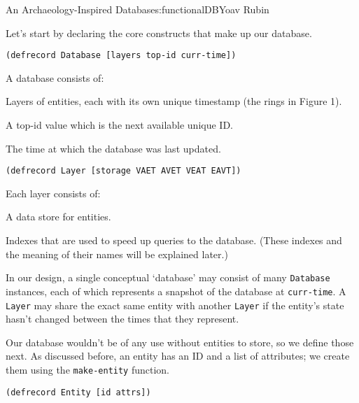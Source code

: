 \begin{aosachapter}{An Archaeology-Inspired Database}{s:functionalDB}{Yoav Rubin}
\label{laying-the-foundation}

Let's start by declaring the core constructs that make up our database.

\begin{verbatim}
(defrecord Database [layers top-id curr-time])
\end{verbatim}

A database consists of:

\begin{aosaenumerate}
\def\labelenumi{\arabic{enumi}.}

\item
  Layers of entities, each with its own unique timestamp (the rings in
  Figure 1).
\item
  A top-id value which is the next available unique ID.
\item
  The time at which the database was last updated.
\end{aosaenumerate}

\begin{verbatim}
(defrecord Layer [storage VAET AVET VEAT EAVT])
\end{verbatim}

Each layer consists of:

\begin{aosaenumerate}
\def\labelenumi{\arabic{enumi}.}

\item
  A data store for entities.
\item
  Indexes that are used to speed up queries to the database. (These
  indexes and the meaning of their names will be explained later.)
\end{aosaenumerate}

In our design, a single conceptual `database' may consist of many
\texttt{Database} instances, each of which represents a snapshot of the
database at \texttt{curr-time}. A \texttt{Layer} may share the exact
same entity with another \texttt{Layer} if the entity's state hasn't
changed between the times that they represent.

\label{entities}

Our database wouldn't be of any use without entities to store, so we
define those next. As discussed before, an entity has an ID and a list
of attributes; we create them using the \texttt{make-entity} function.

\begin{verbatim}
(defrecord Entity [id attrs])


\end{verbatim}
\end{aosachapter}
